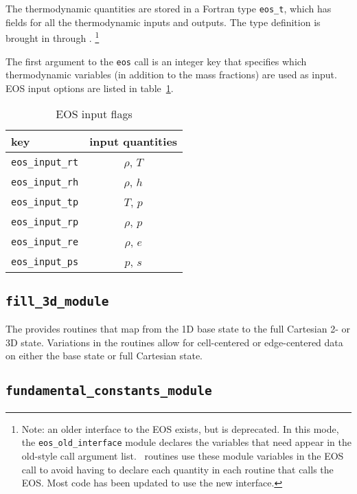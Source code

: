 The thermodynamic quantities are stored in a Fortran type {\tt eos\_t},
which has fields for all the thermodynamic inputs and outputs.  The 
type definition is brought in through .
\footnote{ Note: an older interface to the EOS exists, but is
  deprecated.  In this mode, the {\tt eos\_old\_interface} module declares 
  the variables that need appear in the old-style  call
  argument list.  \maestro\ routines use these module variables in the
  EOS call to avoid having to declare each quantity in each routine
  that calls the EOS.  Most code has been updated to use the new interface.}

The first argument to the {\tt eos} call is an integer key that
specifies which thermodynamic variables (in addition to the mass
fractions) are used as input.  EOS input options are listed 
in table~\ref{arch:table:eosinput}.

   \begin{table}[h]
   \caption{\label{arch:table:eosinput} EOS input flags}
   \begin{center}
   \begin{tabular}{lc}
   \hline
   key            & input quantities \\
   \hline
   {\tt eos\_input\_rt}       & $\rho$, $T$ \\
   {\tt eos\_input\_rh}       & $\rho$, $h$ \\
   {\tt eos\_input\_tp}       & $T$, $p$ \\
   {\tt eos\_input\_rp}       & $\rho$, $p$ \\
   {\tt eos\_input\_re}       & $\rho$, $e$ \\
   {\tt eos\_input\_ps}       & $p$, $s$ \\
   \hline
   \end{tabular}
   \end{center}
   \end{table}



\subsection{{\tt fill\_3d\_module}}

The  provides routines that map from the 1D
base state to the full Cartesian 2- or 3D state.  Variations in the
routines allow for cell-centered or edge-centered data on either the
base state or full Cartesian state.

\subsection{\tt fundamental\_constants\_module}

